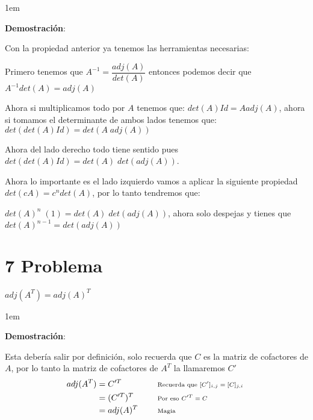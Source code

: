 \documentclass[12pt, fleqn]{article}                             %
\newenvironment{SmallIndentation}[1][0.75em]                    %
        {\begin{adjustwidth}{#1}{}\begin{footnotesize}}             %
        {\end{footnotesize}\end{adjustwidth}}                       %
\DeclareMathOperator \Space {\quad}                             %
\newcommand \Remember[1]{\Space\text{\scriptsize{#1}}}          %
\theoremstyle{break}                                            %
\begin{document}
\begin{itemize}
            \begin{SmallIndentation}[1em]
                \textbf{Demostración}:
                
                Con la propiedad anterior ya tenemos las herramientas
                necesarias:

                Primero tenemos que $A^{-1} = \dfrac{adj(A)}{det(A)}$
                entonces podemos decir que $A^{-1} det(A) = adj(A)$

                Ahora si multiplicamos todo por $A$ tenemos que:
                $det(A) Id = A adj(A)$, ahora si tomamos el determinante
                de ambos lados tenemos que:
                $det(det(A) Id) = det(A \; adj(A))$

                Ahora del lado derecho todo tiene sentido pues
                $det(det(A) Id) = det(A) \; det(adj(A))$.

                Ahora lo importante es el lado izquierdo vamos a aplicar
                la siguiente propiedad $det(cA) = c^n det(A)$, por lo tanto
                tendremos que:

                $det(A)^n \; (1) = det(A) \; det(adj(A))$, ahora solo despejas
                y tienes que $det(A)^{n-1} = det(adj(A))$
            
            \end{SmallIndentation}
                
    \end{itemize}



\clearpage
\section{7 Problema}

    $adj(A^T) = adj(A)^T$

    \begin{SmallIndentation}[1em]
        \textbf{Demostración}:
        
        Esta debería salir por definición, solo recuerda que $C$ es la matriz de cofactores de $A$,
        por lo tanto la matriz de cofactores de $A^T$ la llamaremos $C'$
        \begin{align*}
            adj(A^T)
                &= C'^T
                    && \Remember{Recuerda que $[C']_{i, j} = [C]_{j, i}$ }   \\
                &= (C'^T)^T                                            
                    && \Remember{Por eso $C'^T = C$ }   \\
                &= adj(A)^T
                    && \Remember{Magia}
        \end{align*}
    
    \end{SmallIndentation}
\end{document}
